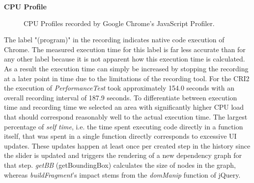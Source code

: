 	\textbf{CPU Profile}\\
	\begin{figure}[!h]
	\centering
	\hfill
	\caption{CPU Profiles recorded by Google Chrome's JavaScript Profiler.}
	\end{figure}
	The label "(program)" in the recording indicates native code execution of Chrome. The measured execution time for this label is far less accurate than for any other label because it is not apparent how this execution time is calculated. As a result the execution time can simply be increased by stopping the recording at a later point in time due to the limitations of the recording tool.	
	For the CRI2 the execution of \emph{PerformanceTest} took approximately 154.0 seconds with an overall recording interval of 187.9 seconds. To differentiate between execution time and recording time we selected an area with significantly higher CPU load that should correspond reasonably well to the actual execution time. The largest percentage of \emph{self time}, i.e. the time spent executing code directly in a function itself, that was spent in a single function directly corresponds to excessive UI updates. These updates happen at least once per created step in the history since the slider is updated and triggers the rendering of a new dependency graph for that step. \emph{getBB} (getBoundingBox) calculates the size of nodes in the graph, whereas  \emph{buildFragment}'s impact stems from the \emph{domManip} function of jQuery.\\

